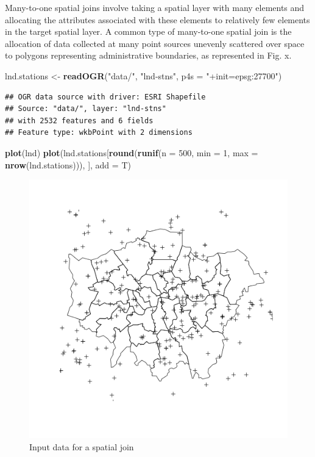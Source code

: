 \documentclass[]{article}
\makeatletter
\newenvironment{Shaded}{}{}
\newcommand{\KeywordTok}[1]{\textcolor[rgb]{0.00,0.44,0.13}{\textbf{{#1}}}}
\newcommand{\DataTypeTok}[1]{\textcolor[rgb]{0.56,0.13,0.00}{{#1}}}
\newcommand{\DecValTok}[1]{\textcolor[rgb]{0.25,0.63,0.44}{{#1}}}
\newcommand{\StringTok}[1]{\textcolor[rgb]{0.25,0.44,0.63}{{#1}}}
\newcommand{\NormalTok}[1]{{#1}}
\def\maxwidth{\ifdim\Gin@nat@width>\linewidth\linewidth
\else\Gin@nat@width\fi}
\let\Oldincludegraphics\includegraphics
\renewcommand{\includegraphics}[1]{\Oldincludegraphics[width=\maxwidth]{#1}}
\makeatother
\begin{document}
Many-to-one spatial joins involve taking a spatial layer with many
elements and allocating the attributes associated with these elements to
relatively few elements in the target spatial layer. A common type of
many-to-one spatial join is the allocation of data collected at many
point sources unevenly scattered over space to polygons representing
administrative boundaries, as represented in Fig. x.

\begin{Shaded}
\begin{Highlighting}[]
\NormalTok{lnd.stations <- }\KeywordTok{readOGR}\NormalTok{(}\StringTok{"data/"}\NormalTok{, }\StringTok{"lnd-stns"}\NormalTok{, }\DataTypeTok{p4s =} \StringTok{"+init=epsg:27700"}\NormalTok{)}
\end{Highlighting}
\end{Shaded}
\begin{verbatim}
## OGR data source with driver: ESRI Shapefile 
## Source: "data/", layer: "lnd-stns"
## with 2532 features and 6 fields
## Feature type: wkbPoint with 2 dimensions
\end{verbatim}
\begin{Shaded}
\begin{Highlighting}[]
\KeywordTok{plot}\NormalTok{(lnd)}
\KeywordTok{plot}\NormalTok{(lnd.stations[}\KeywordTok{round}\NormalTok{(}\KeywordTok{runif}\NormalTok{(}\DataTypeTok{n =} \DecValTok{500}\NormalTok{, }\DataTypeTok{min =} \DecValTok{1}\NormalTok{, }\DataTypeTok{max =} \KeywordTok{nrow}\NormalTok{(lnd.stations))), }
    \NormalTok{], }\DataTypeTok{add =} \NormalTok{T)}
\end{Highlighting}
\end{Shaded}
\begin{figure}[htbp]
\centering
\includegraphics{figure/Input_data_for_a_spatial_join.png}
\caption{Input data for a spatial join}
\end{figure}
\end{document}
